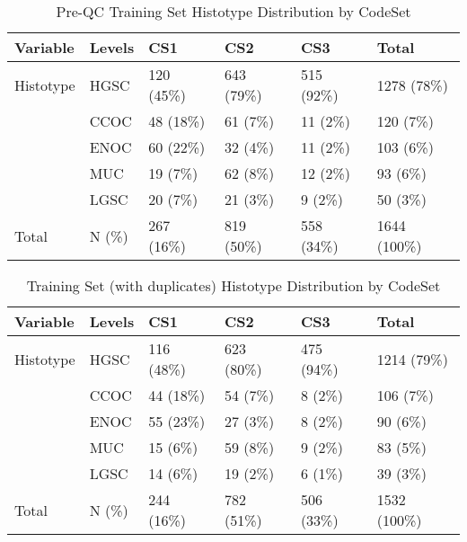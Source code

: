 \documentclass[
]{report}
\begin{document}
\begin{table}

\caption{\label{tab:preqc-hist-codeset}Pre-QC Training Set Histotype Distribution by CodeSet}
\centering
\begin{tabular}[t]{l|l|l|l|l|l}
\hline
Variable & Levels & CS1 & CS2 & CS3 & Total\\
\hline
Histotype & HGSC & 120 (45\%) & 643 (79\%) & 515 (92\%) & 1278 (78\%)\\
\hline
 & CCOC & 48 (18\%) & 61 (7\%) & 11 (2\%) & 120 (7\%)\\
\hline
 & ENOC & 60 (22\%) & 32 (4\%) & 11 (2\%) & 103 (6\%)\\
\hline
 & MUC & 19 (7\%) & 62 (8\%) & 12 (2\%) & 93 (6\%)\\
\hline
 & LGSC & 20 (7\%) & 21 (3\%) & 9 (2\%) & 50 (3\%)\\
\hline
Total & N (\%) & 267 (16\%) & 819 (50\%) & 558 (34\%) & 1644 (100\%)\\
\hline
\end{tabular}
\end{table}

\begin{table}

\caption{\label{tab:train-all-hist-codeset}Training Set (with duplicates) Histotype Distribution by CodeSet}
\centering
\begin{tabular}[t]{l|l|l|l|l|l}
\hline
Variable & Levels & CS1 & CS2 & CS3 & Total\\
\hline
Histotype & HGSC & 116 (48\%) & 623 (80\%) & 475 (94\%) & 1214 (79\%)\\
\hline
 & CCOC & 44 (18\%) & 54 (7\%) & 8 (2\%) & 106 (7\%)\\
\hline
 & ENOC & 55 (23\%) & 27 (3\%) & 8 (2\%) & 90 (6\%)\\
\hline
 & MUC & 15 (6\%) & 59 (8\%) & 9 (2\%) & 83 (5\%)\\
\hline
 & LGSC & 14 (6\%) & 19 (2\%) & 6 (1\%) & 39 (3\%)\\
\hline
Total & N (\%) & 244 (16\%) & 782 (51\%) & 506 (33\%) & 1532 (100\%)\\
\hline
\end{tabular}
\end{table}
\end{document}
